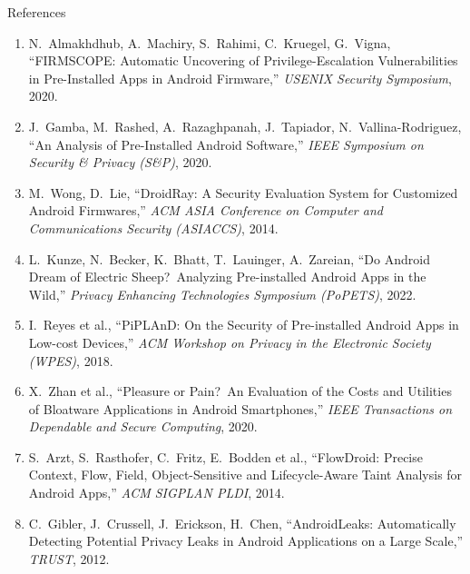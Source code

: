 \documentclass[aspectratio=169]{beamer}
\begin{document}
\begin{frame}[allowframebreaks]{References}
\scriptsize
\begin{enumerate}
    \item N.\ Almakhdhub, A.\ Machiry, S.\ Rahimi, C.\ Kruegel, G.\ Vigna,
          ``FIRMSCOPE: Automatic Uncovering of Privilege-Escalation Vulnerabilities
          in Pre-Installed Apps in Android Firmware,''
          \textit{USENIX Security Symposium}, 2020.

    \item J.\ Gamba, M.\ Rashed, A.\ Razaghpanah, J.\ Tapiador, N.\ Vallina-Rodriguez,
          ``An Analysis of Pre-Installed Android Software,''
          \textit{IEEE Symposium on Security \& Privacy (S\&P)}, 2020.

    \item M.\ Wong, D.\ Lie,
          ``DroidRay: A Security Evaluation System for Customized Android Firmwares,''
          \textit{ACM ASIA Conference on Computer and Communications Security (ASIACCS)},
          2014.

    \item L.\ Kunze, N.\ Becker, K.\ Bhatt, T.\ Lauinger, A.\ Zareian,
          ``Do Android Dream of Electric Sheep?\ Analyzing Pre-installed Android Apps
          in the Wild,''
          \textit{Privacy Enhancing Technologies Symposium (PoPETS)}, 2022.

    \item I.\ Reyes et al.,
          ``PiPLAnD: On the Security of Pre-installed Android Apps in Low-cost Devices,''
          \textit{ACM Workshop on Privacy in the Electronic Society (WPES)}, 2018.

    \item X.\ Zhan et al.,
          ``Pleasure or Pain?\ An Evaluation of the Costs and Utilities of Bloatware
          Applications in Android Smartphones,''
          \textit{IEEE Transactions on Dependable and Secure Computing}, 2020.

    \item S.\ Arzt, S.\ Rasthofer, C.\ Fritz, E.\ Bodden et al.,
          ``FlowDroid: Precise Context, Flow, Field, Object-Sensitive and
          Lifecycle-Aware Taint Analysis for Android Apps,''
          \textit{ACM SIGPLAN PLDI}, 2014.

    \item C.\ Gibler, J.\ Crussell, J.\ Erickson, H.\ Chen,
          ``AndroidLeaks: Automatically Detecting Potential Privacy Leaks in
          Android Applications on a Large Scale,''
          \textit{TRUST}, 2012.


\end{enumerate}
\end{frame}
\end{document}
